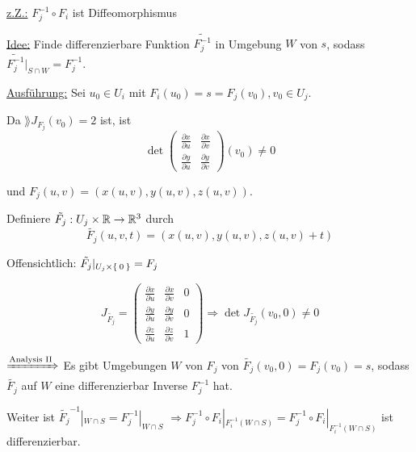 \begin{beweis}
    \underline{z.Z.:} $F_j^{-1} \circ F_i$ ist Diffeomorphismus


    \underline{Idee:} Finde differenzierbare Funktion $\tilde{F_j^{-1}}$
    in Umgebung $W$ von $s$, sodass $\tilde{F_j^{-1}}|_{S \cap W} = F_j^{-1}$.

    \underline{Ausführung:} Sei $u_0 \in U_i$ mit $F_i(u_0) = s = F_j(v_0), v_0 \in U_j$.

    Da $\rang{J_{F_j}(v_0)} = 2$ ist, ist \obda 
    \[\det 
        \begin{pmatrix}
            \frac{\partial x}{\partial u} & \frac{\partial x}{\partial v}\\
            \frac{\partial y}{\partial u} & \frac{\partial y}{\partial v}
        \end{pmatrix} (v_0) \neq 0
    \]

    und $F_j(u,v) = \left ( x(u,v), y(u,v), z(u,v) \right)$.

    Definiere $\tilde{F_j}: U_j \times \mathbb{R} \rightarrow \mathbb{R}^3$ durch
    \[\tilde{F_j} (u, v, t) = \left(x(u,v), y(u,v), z(u,v)+t \right )\]
    
    Offensichtlich: $\tilde{F_j} |_{U_j \times \Set{0}} = F_j$

    \[J_{\tilde{F_j}} = 
    \begin{pmatrix}
        \frac{\partial x}{\partial u}   & \frac{\partial x}{\partial v} & 0\\
        \frac{\partial y}{\partial u}   & \frac{\partial y}{\partial v} & 0\\
        \frac{\partial z}{\partial u}   & \frac{\partial z}{\partial v} & 1
    \end{pmatrix} \Rightarrow \det J_{\tilde{F_j}} (v_0, 0) \neq  0\]

    $\xRightarrow{\text{Analysis II}}$ Es gibt Umgebungen $W$ von
    $F_j$ von $\tilde{F_j}(v_0, 0) = F_j(v_0) = s$, sodass $\tilde{F_j}$
    auf $W$ eine differenzierbar Inverse $F_j^{-1}$ hat.

    Weiter ist $\tilde{F_j}^{-1}|_{W \cap S} = F_j^{-1} |_{W \cap S}$
    $\Rightarrow F_j^{-1} \circ F_i |_{F_i^{-1} (W \cap S)} = F_j^{-1} \circ F_i |_{F_i^{-1} (W \cap S)}$
    ist differenzierbar.
\end{beweis}

